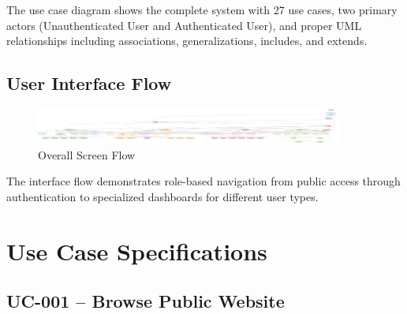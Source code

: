 \documentclass[12pt,a4paper]{article}
\begin{document}
The use case diagram shows the complete system with 27 use cases, two primary actors (Unauthenticated User and Authenticated User), and proper UML relationships including associations, generalizations, includes, and extends.

\subsection{User Interface Flow}

\begin{figure}[H]
    \centering
    \includegraphics[width=0.9\textwidth]{diagrams/user_interface_flow.png}
    \caption{Overall Screen Flow}
    \label{fig:screen-flow}
\end{figure}

The interface flow demonstrates role-based navigation from public access through authentication to specialized dashboards for different user types.

\newpage

\section{Use Case Specifications}

\subsection{UC-001 – Browse Public Website}
\end{document}
